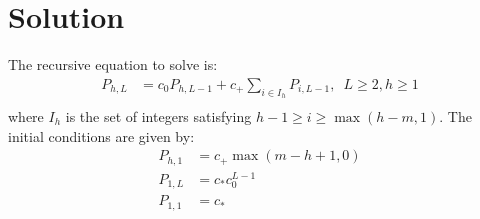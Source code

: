 

\section{Solution}
	The recursive equation to solve is:
	\begin{align}
		P_{h, L} &= c_0P_{h, L - 1} + c_+ \sum_{i\in I_h} P_{i, L-1},\,\,\, L \ge 2, h \ge 1\\ %
	\end{align}
	where $I_h$ is the set of integers satisfying $h - 1 \ge i \ge \max(h - m, 1)$. The initial conditions are given by:
	\begin{align}
		P_{h, 1} &= c_+ \max(m - h + 1, 0)\\
		P_{1, L} &= c_* c_0^{L-1}\\
		P_{1, 1} &= c_*
	\end{align}
	
